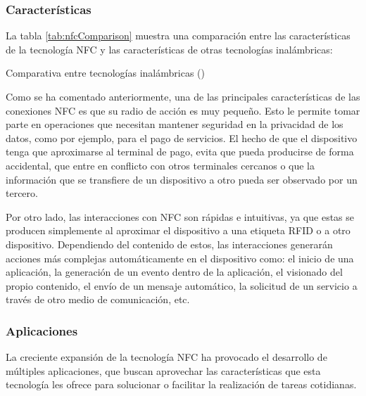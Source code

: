   \subsubsection{Características}

La tabla \ref{tab:nfcComparison} muestra una comparación entre 
las características de la tecnología \acs{NFC} y las características de 
otras tecnologías inalámbricas:

\begin{sidewaystable}[hp]
  \centering
  {\footnotesize
  
  }
  \caption[Comparativa entre tecnologías inalámbricas]
  {Comparativa entre tecnologías inalámbricas (\cite{bib:nfcComparison})}
  \label{tab:nfcComparison}
\end{sidewaystable}

Como se ha comentado anteriormente, una de las principales características de 
las conexiones \acs{NFC} es que su radio de acción es muy pequeño. Esto le
permite tomar parte en operaciones que necesitan mantener seguridad en la
privacidad de los datos, como por ejemplo, para el pago de servicios. El
hecho de que el dispositivo tenga que aproximarse al terminal de pago, evita
que pueda producirse de forma accidental, que entre en conflicto con otros
terminales cercanos o que la información que se transfiere de un dispositivo
a otro pueda ser observado por un tercero.

Por otro lado, las interacciones con \acs{NFC} son rápidas e intuitivas, ya 
que estas se producen  simplemente al aproximar el dispositivo a una etiqueta 
\acs{RFID} o a otro dispositivo. Dependiendo del contenido de estos, las 
interacciones generarán acciones más complejas automáticamente en el 
dispositivo como: el inicio de una aplicación, la generación de un evento 
dentro de la aplicación, el visionado del propio contenido, el envío de un 
mensaje automático, la solicitud de un servicio a través de otro medio de 
comunicación, etc.

  \subsubsection{Aplicaciones}
La creciente expansión de la tecnología \acs{NFC} ha provocado el desarrollo
de múltiples aplicaciones, que buscan aprovechar las características que esta 
tecnología les ofrece para solucionar o facilitar la realización de tareas 
cotidianas.

